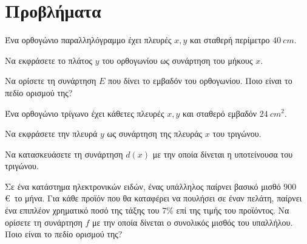 \documentclass[11pt,a4paper,twocolumn]{article}
\begin{document}
\section{Προβλήματα}
\begin{askhseis}
\item Ένα ορθογώνιο παραλληλόγραμμο έχει πλευρές $x,y$ και σταθερή περίμετρο $40\ cm$.
\begin{alist}
\item Να εκφράσετε το πλάτος $y$ του ορθογωνίου ως συνάρτηση του μήκους $x$.
\item Να ορίσετε τη συνάρτηση $E$ που δίνει το εμβαδόν του ορθογωνίου. Ποιο είναι το πεδίο ορισμού της? 
\end{alist}
\item Ένα ορθογώνιο τρίγωνο έχει κάθετες πλευρές $x,y$ και σταθερό εμβαδόν $24\ cm^2$.
\begin{alist}
\item Να εκφράσετε την πλευρά $y$ ως συνάρτηση της πλευράς $x$ του τριγώνου.
\item Να κατασκευάσετε τη συνάρτηση $d(x)$ με την οποία δίνεται η υποτείνουσα του τριγώνου. 
\end{alist}
\item Σε ένα κατάστημα ηλεκτρονικών ειδών, ένας υπάλληλος παίρνει βασικό μισθό $900$\euro\ το μήνα. Για κάθε προϊόν που θα καταφέρει να πουλήσει σε έναν πελάτη, παίρνει ένα επιπλέον χρηματικό ποσό της τάξης του $7\%$ επί της τιμής του προϊόντος. Να ορίσετε τη συνάρτηση $f$ με την οποία δίνεται ο συνολικός μισθός του υπαλλήλου. Ποιο είναι το πεδίο ορισμού της?
\item 
\end{askhseis}
\end{document}
